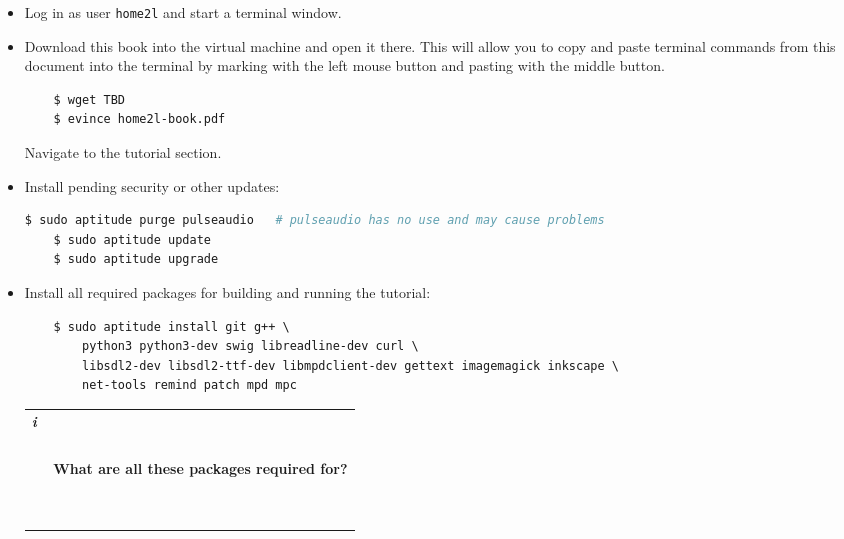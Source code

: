 \documentclass[12pt,english,parskip=half]{scrreprt}
\newcommand{\infobox}[1]{
  \hfill
  \setlength\arrayrulewidth{1pt}
  \begin{tabular}[t]{c|c|}
    \parbox{1.8em}{\hfill\textit{\Huge\textbf{i}\,}}
    &
    \,\parbox{0.89\linewidth}{\setlength{\parskip}{0.5em}#1}\,
  \end{tabular}
  \par
}
\begin{document}
\begin{itemize}[$\blacktriangleright$]

\item
  Log in as user \texttt{home2l} and start a terminal window.

\item
  Download this book into the virtual machine and open it there.
  This will allow you to copy and paste terminal commands from this document into the terminal 
  by marking with the left mouse button and pasting with the middle button.
  \begin{lstlisting}
    $ wget TBD
    $ evince home2l-book.pdf
  \end{lstlisting}
  Navigate to the tutorial section. 

\item
  Install pending security or other updates:
  \begin{lstlisting}[language=bash]
    $ sudo aptitude purge pulseaudio   # pulseaudio has no use and may cause problems
    $ sudo aptitude update
    $ sudo aptitude upgrade
  \end{lstlisting}

\item
  Install all required packages for building and running the tutorial:
  \begin{lstlisting}
    $ sudo aptitude install git g++ \
        python3 python3-dev swig libreadline-dev curl \
        libsdl2-dev libsdl2-ttf-dev libmpdclient-dev gettext imagemagick inkscape \
        net-tools remind patch mpd mpc
  \end{lstlisting}

  \infobox{
    \textbf{What are all these packages required for?}

}
\end{itemize}
\end{document}
